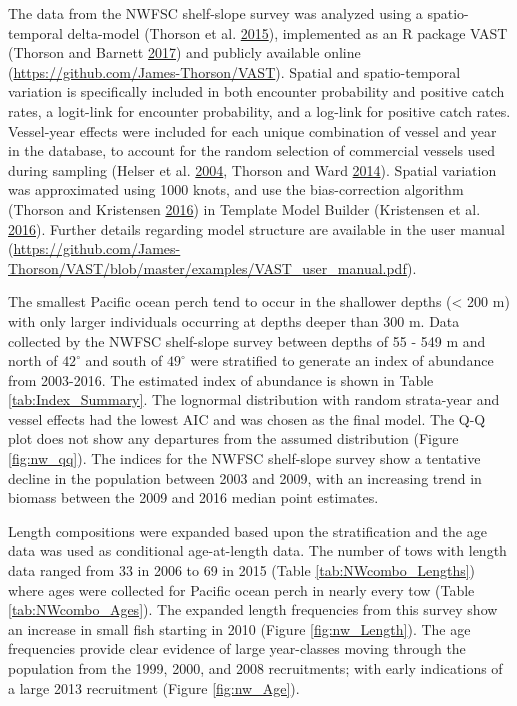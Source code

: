 \documentclass[12pt,]{article}
\begin{document}
The data from the NWFSC shelf-slope survey was analyzed using a
spatio-temporal delta-model (Thorson et al.
\protect\hyperlink{ref-thorson_geostatistical_2015}{2015}), implemented
as an R package VAST (Thorson and Barnett
\protect\hyperlink{ref-thorson_comparing_2017}{2017}) and publicly
available online (\url{https://github.com/James-Thorson/VAST}). Spatial
and spatio-temporal variation is specifically included in both encounter
probability and positive catch rates, a logit-link for encounter
probability, and a log-link for positive catch rates. Vessel-year
effects were included for each unique combination of vessel and year in
the database, to account for the random selection of commercial vessels
used during sampling (Helser et al.
\protect\hyperlink{ref-helser_generalized_2004}{2004}, Thorson and Ward
\protect\hyperlink{ref-thorson_accounting_2014}{2014}). Spatial
variation was approximated using 1000 knots, and use the bias-correction
algorithm (Thorson and Kristensen
\protect\hyperlink{ref-thorson_implementing_2016}{2016}) in Template
Model Builder (Kristensen et al.
\protect\hyperlink{ref-kristensen_tmb:_2016}{2016}). Further details
regarding model structure are available in the user manual
(\url{https://github.com/James-Thorson/VAST/blob/master/examples/VAST_user_manual.pdf}).

The smallest Pacific ocean perch tend to occur in the shallower depths
(\textless{} 200 m) with only larger individuals occurring at depths
deeper than 300 m. Data collected by the NWFSC shelf-slope survey
between depths of 55 - 549 m and north of \(42^\circ\) and south of
\(49^\circ\) were stratified to generate an index of abundance from
2003-2016. The estimated index of abundance is shown in Table
\ref{tab:Index_Summary}. The lognormal distribution with random
strata-year and vessel effects had the lowest AIC and was chosen as the
final model. The Q-Q plot does not show any departures from the assumed
distribution (Figure \ref{fig:nw_qq}). The indices for the NWFSC
shelf-slope survey show a tentative decline in the population between
2003 and 2009, with an increasing trend in biomass between the 2009 and
2016 median point estimates.

Length compositions were expanded based upon the stratification and the
age data was used as conditional age-at-length data. The number of tows
with length data ranged from 33 in 2006 to 69 in 2015 (Table
\ref{tab:NWcombo_Lengths}) where ages were collected for Pacific ocean
perch in nearly every tow (Table \ref{tab:NWcombo_Ages}). The expanded
length frequencies from this survey show an increase in small fish
starting in 2010 (Figure \ref{fig:nw_Length}). The age frequencies
provide clear evidence of large year-classes moving through the
population from the 1999, 2000, and 2008 recruitments; with early
indications of a large 2013 recruitment (Figure \ref{fig:nw_Age}).
\end{document}
